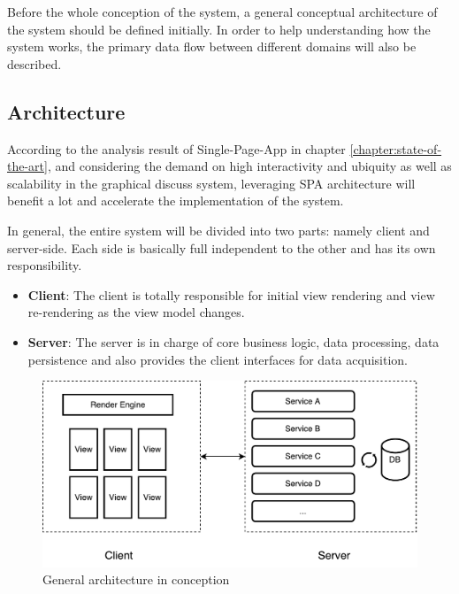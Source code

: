 Before the whole conception of the system, a general conceptual architecture of the system should be defined initially. In order to help understanding how the system works, the primary data flow between different domains will also be described.

\subsection{Architecture} \label{sec:concept-general-architecture}
According to the analysis result of Single-Page-App in chapter \ref{chapter:state-of-the-art}, and considering the demand on high interactivity and ubiquity as well as scalability in the graphical discuss system, leveraging SPA architecture will benefit a lot and accelerate the implementation of the system. 

In general, the entire system will be divided into two parts: namely client and server-side. Each side is basically full independent to the other and has its own responsibility. 

\begin{itemize}
\item
\textbf{Client}: The client is totally responsible for initial view rendering and view re-rendering as the view model changes. 
\item
\textbf{Server}: The server is in charge of core business logic, data processing, data persistence and also provides the client interfaces for data acquisition.
\end{itemize}

\begin{figure}[!htbp]
  \centering
    \includegraphics[width=1\textwidth]{Figures/concept-general-architecture.pdf}
  \caption{General architecture in conception}
  \label{fig:general-architecture-concept}
\end{figure}

